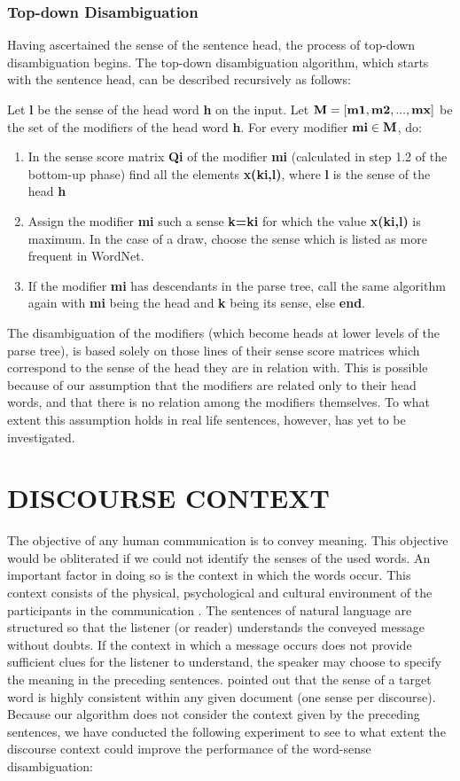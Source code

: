 \subsubsection{Top-down Disambiguation}

Having ascertained the sense of the sentence head, the process of top-down disambiguation begins. The top-down disambiguation algorithm, which starts with the sentence head, can be described recursively as follows:

Let {\bf l} be the sense of the head word {\bf h} on the input. Let ${\bf M = [m1,m2,...,mx]}$ be the set of the modifiers of the head word {\bf h}. 
For every modifier ${\bf mi \in M}$, do:

\begin{enumerate}
\item 
      In the sense score matrix {\bf Qi} of the modifier {\bf mi} (calculated in step 1.2 of the bottom-up phase) find all the elements {\bf x(ki,l)}, where {\bf l} is the sense of the head {\bf h}
\item 
      Assign the modifier {\bf mi} such a sense {\bf k=ki} for which the value {\bf x(ki,l)} is maximum. In the case of a draw, choose the sense which is listed as more frequent in WordNet.
\item 
      If the modifier {\bf mi} has descendants in the parse tree, call the same algorithm again with {\bf mi} being the head and {\bf k} being its sense, else {\bf end}.
\end{enumerate}
The disambiguation of the modifiers (which become heads at lower levels of the parse tree), is based solely on those lines of their sense score matrices which correspond to the sense of the head they are in relation with. This is possible because of our assumption that the modifiers are related only to their head words, and that there is no relation among the modifiers themselves. To what extent this assumption holds in real life sentences, however, has yet to be investigated.

\section{DISCOURSE CONTEXT}
The objective of any human communication is to convey meaning. This objective would be obliterated if we could not identify the senses of the used words. An important factor in doing so is the context in which the words occur. This context consists of the physical, psychological and cultural environment of the participants in the communication \cite{Ben86}. The sentences of natural language are structured so that the listener (or reader) understands the conveyed message without doubts. If the context in which a message occurs does not provide sufficient clues for the listener to understand, the speaker may choose to specify the meaning in the preceding sentences. \cite{Yarowsky95} pointed out that the sense of a target word is highly consistent within any given document (one sense per discourse). Because our algorithm does not consider the context given by the preceding sentences, we have conducted the following experiment to see to what extent the discourse context could improve the performance of the word-sense disambiguation:

